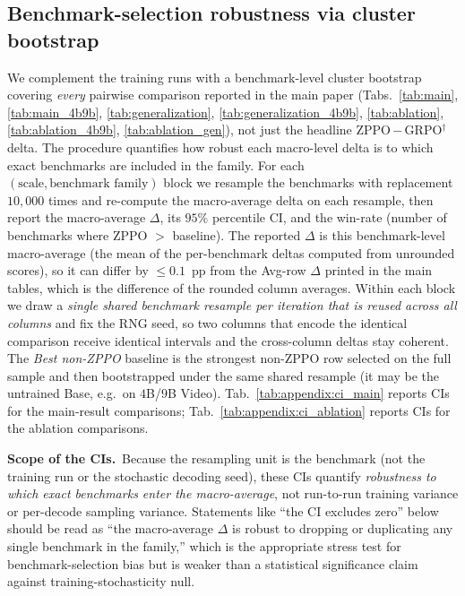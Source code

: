 \documentclass{llmxive}
\begin{document}
\subsection{Benchmark-selection robustness via cluster bootstrap}
\label{sec:appendix:stat_reliability}

We complement the training runs with a benchmark-level cluster bootstrap covering \emph{every} pairwise comparison reported in the main paper (Tabs.~\ref{tab:main}, \ref{tab:main_4b9b}, \ref{tab:generalization}, \ref{tab:generalization_4b9b}, \ref{tab:ablation}, \ref{tab:ablation_4b9b}, \ref{tab:ablation_gen}), not just the headline ZPPO\,$-$\,GRPO$^{\dagger}$ delta. The procedure quantifies how robust each macro-level delta is to which exact benchmarks are included in the family. For each $(\text{scale}, \text{benchmark family})$ block we resample the benchmarks with replacement $10{,}000$ times and re-compute the macro-average delta on each resample, then report the macro-average $\Delta$, its $95\%$ percentile CI, and the win-rate (number of benchmarks where ZPPO $>$ baseline). The reported $\Delta$ is this benchmark-level macro-average (the mean of the per-benchmark deltas computed from unrounded scores), so it can differ by ${\le}0.1$~pp from the Avg-row $\Delta$ printed in the main tables, which is the difference of the rounded column averages. Within each block we draw a \emph{single shared benchmark resample per iteration that is reused across all columns} and fix the RNG seed, so two columns that encode the identical comparison receive identical intervals and the cross-column deltas stay coherent. The \emph{Best non-ZPPO} baseline is the strongest non-ZPPO row selected on the full sample and then bootstrapped under the same shared resample (it may be the untrained Base, e.g.\ on $4$B/$9$B Video). Tab.~\ref{tab:appendix:ci_main} reports CIs for the main-result comparisons; Tab.~\ref{tab:appendix:ci_ablation} reports CIs for the ablation comparisons.

\textbf{Scope of the CIs.}~Because the resampling unit is the benchmark (not the training run or the stochastic decoding seed), these CIs quantify \emph{robustness to which exact benchmarks enter the macro-average}, not run-to-run training variance or per-decode sampling variance. Statements like ``the CI excludes zero'' below should be read as ``the macro-average $\Delta$ is robust to dropping or duplicating any single benchmark in the family,'' which is the appropriate stress test for benchmark-selection bias but is weaker than a statistical significance claim against training-stochasticity null.
\end{document}

